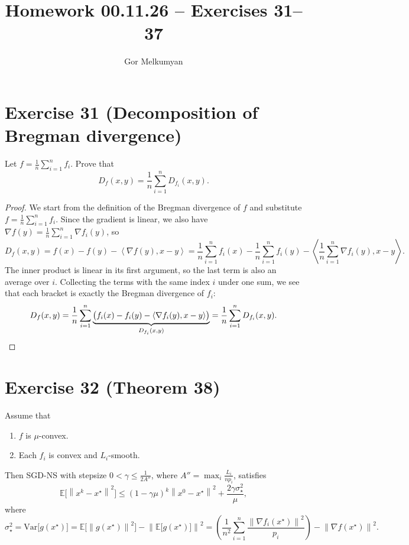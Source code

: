 \documentclass[11pt,a4paper]{article}
\title{Homework 00.11.26 -- Exercises 31--37}
\author{Gor Melkumyan}
\date{}
\newcommand{\E}{\mathbb{E}}
\newcommand{\norm}[1]{\left\| #1 \right\|}
\newcommand{\ip}[2]{\left\langle #1, #2 \right\rangle}
\newcommand{\xs}{x^\star}
\begin{document}
\maketitle

\section*{Exercise 31 (Decomposition of Bregman divergence)}

Let $f = \frac{1}{n}\sum_{i=1}^n f_i$. Prove that
\[
  D_f(x,y) = \frac{1}{n}\sum_{i=1}^n D_{f_i}(x,y).
\]

\begin{proof}
We start from the definition of the Bregman divergence of $f$ and substitute
$f = \frac{1}{n}\sum_{i=1}^n f_i$. Since the gradient is linear, we also have
$\nabla f(y) = \frac{1}{n}\sum_{i=1}^n \nabla f_i(y)$, so
\[
  D_f(x,y)
  = f(x) - f(y) - \ip{\nabla f(y)}{x-y}
  = \frac{1}{n}\sum_{i=1}^n f_i(x) - \frac{1}{n}\sum_{i=1}^n f_i(y)
    - \ip{\frac{1}{n}\sum_{i=1}^n \nabla f_i(y)}{x-y} .
\]
The inner product is linear in its first argument, so the last term is also an average over $i$.
Collecting the terms with the same index $i$ under one sum, we see that each bracket is exactly
the Bregman divergence of $f_i$:
\[
  D_f(x,y)
  = \frac{1}{n}\sum_{i=1}^n \underbrace{\bigl(f_i(x) - f_i(y) - \ip{\nabla f_i(y)}{x-y}\bigr)}_{D_{f_i}(x,y)}
  = \frac{1}{n}\sum_{i=1}^n D_{f_i}(x,y). \qedhere
\]
\end{proof}

\section*{Exercise 32 (Theorem 38)}

Assume that
\begin{enumerate}
  \item $f$ is $\mu$-convex.
  \item Each $f_i$ is convex and $L_i$-smooth.
\end{enumerate}
Then SGD-NS with stepsize $0 < \gamma \le \frac{1}{2A''}$, where
$A'' = \max_i \frac{L_i}{np_i}$, satisfies
\[
  \E\bigl[\norm{x^k - \xs}^2\bigr] \le (1-\gamma\mu)^k\norm{x^0 - \xs}^2 + \frac{2\gamma\sigma_\star^2}{\mu},
\]
where
\[
  \sigma_\star^2 = \mathrm{Var}\bigl[g(\xs)\bigr]
  = \E\bigl[\norm{g(\xs)}^2\bigr] - \norm{\E\bigl[g(\xs)\bigr]}^2
  = \left(\frac{1}{n^2}\sum_{i=1}^n \frac{\norm{\nabla f_i(\xs)}^2}{p_i}\right) - \norm{\nabla f(\xs)}^2 .
\]
\end{document}
